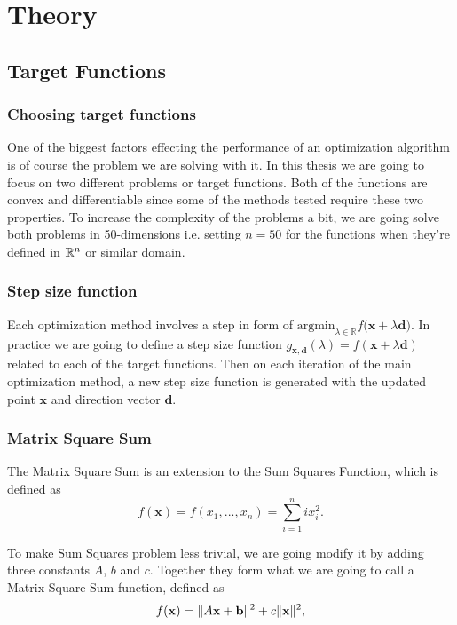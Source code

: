 \documentclass[a4paper,english,titlepage,12pt]{article}
\newcommand{\vect}[1]{\ensuremath{\mathbf{#1}}}
\newcommand{\norm}[1]{\ensuremath\Vert #1 \Vert}
\newcommand{\R}{\ensuremath\mathbb{R}}
\begin{document}
\section{Theory}


\subsection{Target Functions}


\subsubsection{Choosing target functions}


One of the biggest factors effecting the performance of an optimization algorithm is of course the problem we are solving with it. In this thesis we are going to focus on two different problems or target functions. Both of the functions are convex and differentiable since some of the methods tested require these two properties. To increase the complexity of the problems a bit, we are going solve both problems in 50-dimensions i.e. setting $n = 50$ for the functions when they're defined in $\R^n$ or similar domain.


\subsubsection{Step size function}


Each optimization method involves a step in form of $\mathrm{argmin}_{\lambda \in \mathbb{R}} {f(\vect{x} + \lambda \vect{d}})$. In practice we are going to define a step size function $g_{\vect{x}, \vect{d}}(\lambda) = f(\vect{x} + \lambda \vect{d})$ related to each of the target functions. Then on each iteration of the main optimization method, a new step size function is generated with the updated point $\vect{x}$ and direction vector $\vect{d}$.


\subsubsection{Matrix Square Sum} \label{sect:matrix_square_sum}


The Matrix Square Sum is an extension to the Sum Squares Function, which is defined as
\begin{equation}
    f(\mathbf{x})=f(x_1, ..., x_n)=\sum_{i=1}^{n}{ix_i^2}.
\end{equation}

To make Sum Squares problem less trivial, we are going modify it by adding three constants $A$, $b$ and $c$. Together they form what we are going to call a Matrix Square Sum function, defined as
\begin{equation}
    f(\vect{x}) = \norm{A \vect{x} + \vect{b}} ^ 2 + c \norm{\vect{x}} ^ 2,
\end{equation}
\end{document}
